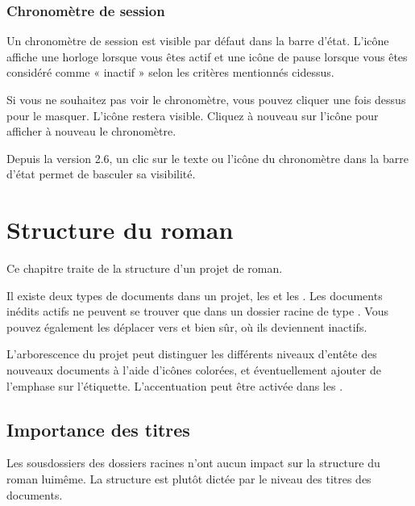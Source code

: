 \documentclass[a4paper,11pt,french]{sphinxmanual}
\begin{document}
\subsection{Chronomètre de session}
\label{\detokenize{project_overview:session-timer}}
\sphinxAtStartPar
Un chronomètre de session est visible par défaut dans la barre d’état. L’icône affiche une horloge lorsque vous êtes actif et une icône de pause lorsque vous êtes considéré comme « inactif » selon les critères mentionnés ci\sphinxhyphen{}dessus.

\sphinxAtStartPar
Si vous ne souhaitez pas voir le chronomètre, vous pouvez cliquer une fois dessus pour le masquer. L’icône restera visible. Cliquez à nouveau sur l’icône pour afficher à nouveau le chronomètre.

\sphinxAtStartPar
{}Depuis la version 2.6, un clic sur le texte ou l’icône du chronomètre dans la barre d’état permet de basculer sa visibilité.

\sphinxstepscope


\chapter{Structure du roman}
\label{\detokenize{project_structure:novel-structure}}\label{\detokenize{project_structure:a-struct}}\label{\detokenize{project_structure::doc}}
\sphinxAtStartPar
Ce chapitre traite de la structure d’un projet de roman.

\sphinxAtStartPar
Il existe deux types de documents dans un projet, les  et les . Les documents inédits actifs ne peuvent se trouver que dans un dossier racine de type . Vous pouvez également les déplacer vers  et  bien sûr, où ils deviennent inactifs.

\sphinxAtStartPar
L’arborescence du projet peut distinguer les différents niveaux d’en\sphinxhyphen{}tête des nouveaux documents à l’aide d’icônes colorées, et éventuellement ajouter de l’emphase sur l’étiquette. L’accentuation peut être activée dans les .


\section{Importance des titres}
\label{\detokenize{project_structure:importance-of-headings}}\label{\detokenize{project_structure:a-struct-heads}}
\sphinxAtStartPar
Les sous\sphinxhyphen{}dossiers des dossiers racines n’ont aucun impact sur la structure du roman lui\sphinxhyphen{}même. La structure est plutôt dictée par le niveau des titres des documents.
\end{document}
